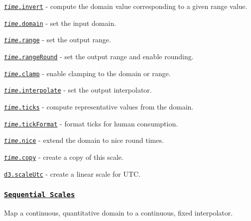 \begin{DoxyItemize}
\item \href{https://github.com/d3/d3-scale/blob/master/README.md#time_invert}{\tt {\itshape time}.invert} -\/ compute the domain value corresponding to a given range value.
\item \href{https://github.com/d3/d3-scale/blob/master/README.md#time_domain}{\tt {\itshape time}.domain} -\/ set the input domain.
\item \href{https://github.com/d3/d3-scale/blob/master/README.md#time_range}{\tt {\itshape time}.range} -\/ set the output range.
\item \href{https://github.com/d3/d3-scale/blob/master/README.md#time_rangeRound}{\tt {\itshape time}.range\+Round} -\/ set the output range and enable rounding.
\item \href{https://github.com/d3/d3-scale/blob/master/README.md#time_clamp}{\tt {\itshape time}.clamp} -\/ enable clamping to the domain or range.
\item \href{https://github.com/d3/d3-scale/blob/master/README.md#time_interpolate}{\tt {\itshape time}.interpolate} -\/ set the output interpolator.
\item \href{https://github.com/d3/d3-scale/blob/master/README.md#time_ticks}{\tt {\itshape time}.ticks} -\/ compute representative values from the domain.
\item \href{https://github.com/d3/d3-scale/blob/master/README.md#time_tickFormat}{\tt {\itshape time}.tick\+Format} -\/ format ticks for human consumption.
\item \href{https://github.com/d3/d3-scale/blob/master/README.md#time_nice}{\tt {\itshape time}.nice} -\/ extend the domain to nice round times.
\item \href{https://github.com/d3/d3-scale/blob/master/README.md#time_copy}{\tt {\itshape time}.copy} -\/ create a copy of this scale.
\item \href{https://github.com/d3/d3-scale/blob/master/README.md#scaleUtc}{\tt d3.\+scale\+Utc} -\/ create a linear scale for U\+TC.
\end{DoxyItemize}

\subsubsection*{\href{https://github.com/d3/d3-scale/blob/master/README.md#sequential-scales}{\tt Sequential Scales}}

Map a continuous, quantitative domain to a continuous, fixed interpolator.


